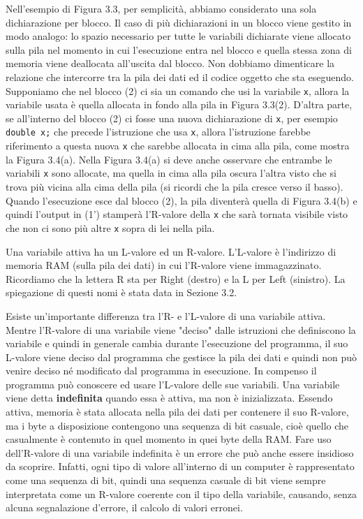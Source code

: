 \documentclass[a4paper,12pt]{book}
\begin{document}
Nell'esempio di Figura 3.3, per semplicità, abbiamo considerato una sola dichiarazione per blocco.
Il caso di più dichiarazioni in un blocco viene gestito in modo analogo: lo spazio necessario per tutte le variabili dichiarate viene allocato sulla pila nel momento in cui l'esecuzione entra nel blocco e quella stessa zona di memoria viene deallocata all'uscita dal blocco.
Non dobbiamo dimenticare la relazione che intercorre tra la pila dei dati ed il codice oggetto che sta eseguendo.
Supponiamo che nel blocco (2) ci sia un comando che usi la variabile \texttt{x}, allora la variabile usata è quella allocata in fondo alla pila in Figura 3.3(2).
D'altra parte, se all'interno del blocco (2) ci fosse una nuova dichiarazione di \texttt{x}, per esempio \texttt{double x;} che precede l'istruzione che usa \texttt{x}, allora l'istruzione farebbe riferimento a questa nuova \texttt{x} che sarebbe allocata in cima alla pila, come mostra la Figura 3.4(a).
Nella Figura 3.4(a) si deve anche osservare che entrambe le variabili \texttt{x} sono allocate, ma quella in cima alla pila oscura l'altra visto che si trova più vicina alla cima della pila (si ricordi che la pila cresce verso il basso).
Quando l'esecuzione esce dal blocco (2), la pila diventerà quella di Figura 3.4(b) e quindi l'output in (1') stamperà l'R-valore della \texttt{x} che sarà tornata visibile visto che non ci sono più altre \texttt{x} sopra di lei nella pila.

Una variabile attiva ha un L-valore ed un R-valore.
L'L-valore è l'indirizzo di memoria RAM (sulla pila dei dati) in cui l'R-valore viene immagazzinato.
Ricordiamo che la lettera R sta per Right (destro) e la L per Left (sinistro).
La spiegazione di questi nomi è stata data in Sezione 3.2. 

Esiste un'importante differenza tra l'R- e l'L-valore di una variabile attiva.
Mentre l'R-valore di una variabile viene "deciso" dalle istruzioni che definiscono la variabile e quindi in generale cambia durante l'esecuzione del programma, il suo L-valore viene deciso dal programma che gestisce la pila dei dati e quindi non può venire deciso né modificato dal programma in esecuzione.
In compenso il programma può conoscere ed usare l'L-valore delle sue variabili. Una variabile viene detta \textbf{indefinita} quando essa è attiva, ma non è inizializzata.
Essendo attiva, memoria è stata allocata nella pila dei dati per contenere il suo R-valore, ma i byte a disposizione contengono una sequenza di bit casuale, cioè quello che casualmente è contenuto in quel momento in quei byte della RAM.
Fare uso dell'R-valore di una variabile indefinita è un errore che può anche essere insidioso da scoprire.
Infatti, ogni tipo di valore all'interno di un computer è rappresentato come una sequenza di bit, quindi una sequenza casuale di bit viene sempre interpretata come un R-valore coerente con il tipo della variabile, causando, senza alcuna segnalazione d'errore, il calcolo di valori erronei. 
\end{document}
